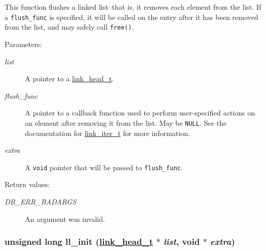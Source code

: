 This function flushes a linked list--that is, it removes each element from the list. If a {\tt flush\_\-func} is specified, it will be called on the entry after it has been removed from the list, and may safely call {\tt free()}.\begin{Desc}
\item[Parameters: ]\par
\begin{description}
\item[{\em 
list}]A pointer to a \hyperlink{group__dbprim__link_a0}{link\_\-head\_\-t}. \item[{\em 
flush\_\-func}]A pointer to a callback function used to perform user-specified actions on an element after removing it from the list. May be {\tt NULL}. See the documentation for \hyperlink{group__dbprim__link_a2}{link\_\-iter\_\-t} for more information. \item[{\em 
extra}]A {\tt void} pointer that will be passed to {\tt flush\_\-func}.\end{description}
\end{Desc}
\begin{Desc}
\item[Return values: ]\par
\begin{description}
\item[{\em 
DB\_\-ERR\_\-BADARGS}]An argument was invalid. \end{description}
\end{Desc}
\hypertarget{group__dbprim__link_a5}{
\subsubsection[ll\_\-init]{\setlength{\rightskip}{0pt plus 5cm}unsigned long ll\_\-init (\hyperlink{group__dbprim__link_a0}{link\_\-head\_\-t} $\ast$ {\em list}, void $\ast$ {\em extra})}}
\label{group__dbprim__link_a5}


